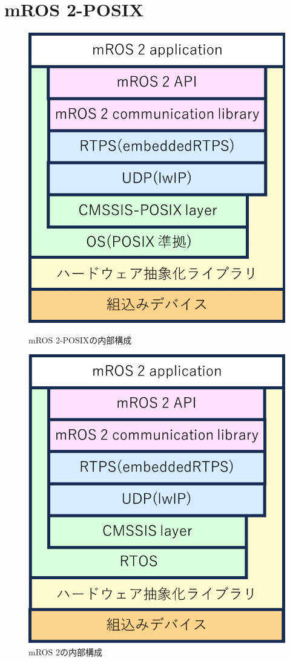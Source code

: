 \section{mROS 2-POSIX}
\begin{figure}[ht]
    \centering
    \begin{minipage}{.48\textwidth}
        \centering
        \includegraphics[width=0.9\linewidth]{images/fig1_mros2posix_a.png}
        \caption{mROS 2-POSIXの内部構成}
        \label{fig:subfig_a}
    \end{minipage}
    \hfill
    \begin{minipage}{.48\textwidth}
        \centering
        \includegraphics[width=0.9\linewidth]{images/fig1_mros2_b.png}
        \caption{mROS 2の内部構成}
        \label{fig:subfig_b}
    \end{minipage}
\end{figure}
